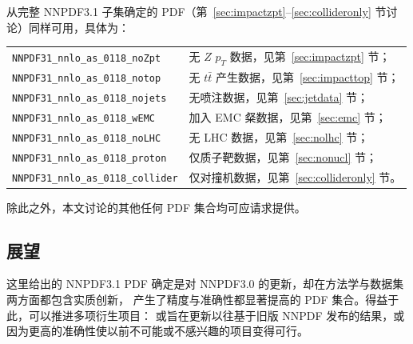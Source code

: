 \begin{itemize}
从完整 NNPDF3.1 子集确定的 PDF（第~\ref{sec:impactzpt}--\ref{sec:collideronly} 节讨论）同样可用，具体为：
  \begin{flushleft}
  \begin{tabular}{ll}
  {\tt NNPDF31\_nnlo\_as\_0118\_noZpt} & 无 $Z$ $p_T$ 数据，见第~\ref{sec:impactzpt} 节； \\
  {\tt NNPDF31\_nnlo\_as\_0118\_notop} & 无 $t\bar{t}$ 产生数据，见第~\ref{sec:impacttop} 节； \\
  {\tt NNPDF31\_nnlo\_as\_0118\_nojets} & 无喷注数据，见第~\ref{sec:jetdata} 节； \\
  {\tt NNPDF31\_nnlo\_as\_0118\_wEMC} & 加入 EMC 粲数据，见第~\ref{sec:emc} 节；\\
  {\tt NNPDF31\_nnlo\_as\_0118\_noLHC} & 无 LHC 数据，见第~\ref{sec:nolhc} 节；  \\
  {\tt NNPDF31\_nnlo\_as\_0118\_proton}  & 仅质子靶数据，见第~\ref{sec:nonucl} 节；\\
  {\tt NNPDF31\_nnlo\_as\_0118\_collider} & 仅对撞机数据，见第~\ref{sec:collideronly} 节。\\
  \end{tabular}
  \end{flushleft}
\end{itemize}

除此之外，本文讨论的其他任何 PDF 集合均可应请求提供。

\subsection{展望}
\label{sec:outlook}

这里给出的 NNPDF3.1 PDF 确定是对 NNPDF3.0 的更新，却在方法学与数据集两方面都包含实质创新，
产生了精度与准确性都显著提高的 PDF 集合。得益于此，可以推进多项衍生项目：
或旨在更新以往基于旧版 NNPDF 发布的结果，或因为更高的准确性使以前不可能或不感兴趣的项目变得可行。

